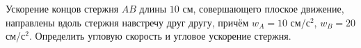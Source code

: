 Ускорение концов стержня $AB$ длины $10$ см, совершающего плоское
движение, направлены вдоль стержня навстречу друг другу, причём $w_A=10$
см/с$^2$, $w_B=20$ см/с$^2$. Определить угловую скорость и угловое
ускорение стержня.
